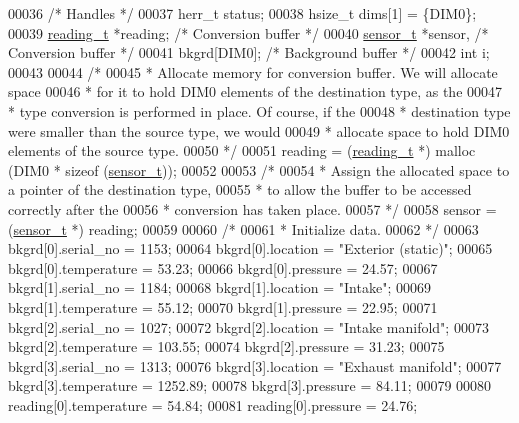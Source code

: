 \begin{DoxyCode}
00036                                             \textcolor{comment}{/* Handles */}
00037     herr\_t      status;
00038     hsize\_t     dims[1] = \{DIM0\};
00039     \hyperlink{structreading__t}{reading\_t}   *reading;                   \textcolor{comment}{/* Conversion buffer */}
00040     \hyperlink{structsensor__t}{sensor\_t}    *sensor,                    \textcolor{comment}{/* Conversion buffer */}
00041                 bkgrd[DIM0];                \textcolor{comment}{/* Background buffer */}
00042     \textcolor{keywordtype}{int}         i;
00043 
00044     \textcolor{comment}{/*}
00045 \textcolor{comment}{     * Allocate memory for conversion buffer.  We will allocate space}
00046 \textcolor{comment}{     * for it to hold DIM0 elements of the destination type, as the}
00047 \textcolor{comment}{     * type conversion is performed in place.  Of course, if the}
00048 \textcolor{comment}{     * destination type were smaller than the source type, we would}
00049 \textcolor{comment}{     * allocate space to hold DIM0 elements of the source type.}
00050 \textcolor{comment}{     */}
00051     reading = (\hyperlink{structreading__t}{reading\_t} *) malloc (DIM0 * \textcolor{keyword}{sizeof} (\hyperlink{structsensor__t}{sensor\_t}));
00052 
00053     \textcolor{comment}{/*}
00054 \textcolor{comment}{     * Assign the allocated space to a pointer of the destination type,}
00055 \textcolor{comment}{     * to allow the buffer to be accessed correctly after the}
00056 \textcolor{comment}{     * conversion has taken place.}
00057 \textcolor{comment}{     */}
00058     sensor = (\hyperlink{structsensor__t}{sensor\_t} *) reading;
00059 
00060     \textcolor{comment}{/*}
00061 \textcolor{comment}{     * Initialize data.}
00062 \textcolor{comment}{     */}
00063     bkgrd[0].serial\_no = 1153;
00064     bkgrd[0].location = \textcolor{stringliteral}{"Exterior (static)"};
00065     bkgrd[0].temperature = 53.23;
00066     bkgrd[0].pressure = 24.57;
00067     bkgrd[1].serial\_no = 1184;
00068     bkgrd[1].location = \textcolor{stringliteral}{"Intake"};
00069     bkgrd[1].temperature = 55.12;
00070     bkgrd[1].pressure = 22.95;
00071     bkgrd[2].serial\_no = 1027;
00072     bkgrd[2].location = \textcolor{stringliteral}{"Intake manifold"};
00073     bkgrd[2].temperature = 103.55;
00074     bkgrd[2].pressure = 31.23;
00075     bkgrd[3].serial\_no = 1313;
00076     bkgrd[3].location = \textcolor{stringliteral}{"Exhaust manifold"};
00077     bkgrd[3].temperature = 1252.89;
00078     bkgrd[3].pressure = 84.11;
00079 
00080     reading[0].temperature = 54.84;
00081     reading[0].pressure = 24.76;

\end{DoxyCode}
